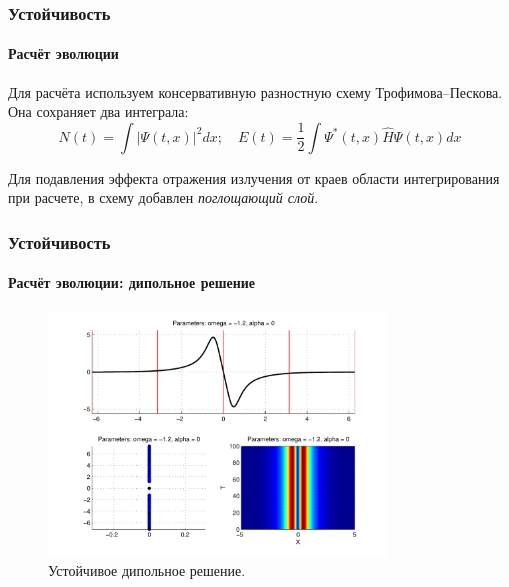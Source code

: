 \documentclass [10pt] {beamer}
\begin{document}
\begin{frame}
	\frametitle{Устойчивость}
	\framesubtitle{Расчёт эволюции}
	
	Для расчёта используем консервативную разностную схему Трофимова--Пескова\footnotemark[6].
	Она сохраняет два интеграла:
	\begin{equation}
		N(t) = \int |\Psi(t, x)|^2 dx; \quad
		E(t) = \dfrac{1}{2} \int \Psi^*(t, x) \widehat{H} \Psi(t, x) dx
	\end{equation}

	Для подавления эффекта отражения излучения от краев области интегрирования при расчете, в схему добавлен {\it {\color{ceruleanblue} поглощающий слой}}. 
	
\end{frame}

\begin{frame}
	\frametitle{Устойчивость}
	\framesubtitle{Расчёт эволюции: дипольное решение}
	
	\begin{figure}
		\includegraphics[width=0.8\textwidth]{pic/dipole_solution_stable.pdf}
		\caption{Устойчивое дипольное решение.}
		\label{pic:dipole_solution_stable}
	\end{figure}
\end{frame}
\end{document}
